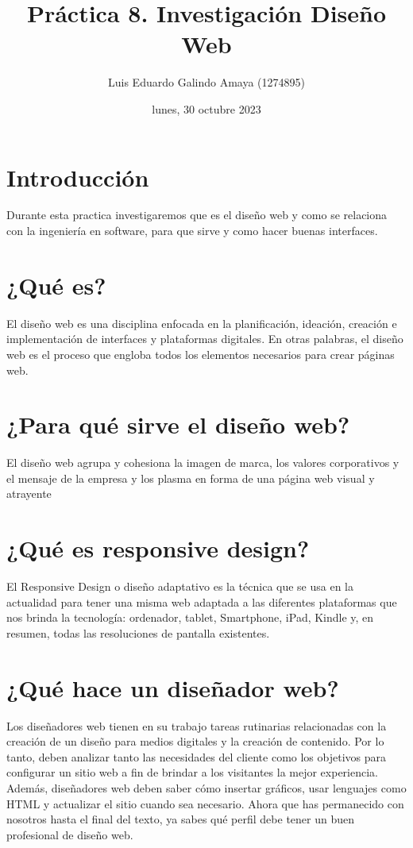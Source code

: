 \documentclass[11pt]{article}
\author{Luis Eduardo Galindo Amaya (1274895)}
\date{lunes, 30 octubre 2023}
\title{Práctica 8. Investigación Diseño Web}
\begin{document}
\makeatletter
\makeatletter
{}
\tableofcontents
\pagebreak
{}

\section{Introducción}
\label{sec:org85d6944}
Durante esta practica investigaremos que es el diseño web y como se relaciona
con la ingeniería en software, para que sirve y como hacer buenas interfaces.

\section{¿Qué es?}
\label{sec:org82e4fe4}
\autocite{sanchez_2022} El diseño web es una disciplina enfocada en la 
planificación, ideación, creación e implementación de interfaces y plataformas 
digitales. En otras palabras, el diseño web es el proceso que engloba todos los 
elementos necesarios para crear páginas web.

\section{¿Para qué sirve el diseño web?}
\label{sec:org528c002}
\autocite{sanchez_2022} El diseño web agrupa y cohesiona la imagen de
marca, los valores corporativos y el mensaje de la empresa y los plasma en 
forma de una página web visual y atrayente

\section{¿Qué es responsive design?}
\label{sec:org78dcf97}
\autocite{pallerols_2022} El Responsive Design o diseño adaptativo es la
técnica que se usa en la actualidad para tener una misma web adaptada a las 
diferentes plataformas que nos brinda la tecnología: ordenador, tablet, 
Smartphone, iPad, Kindle y, en resumen, todas las resoluciones de pantalla 
existentes.

\section{¿Qué hace un diseñador web?}
\label{sec:orgc6d7d28}
\autocite{Dias_Dourado_2021} Los diseñadores web tienen en su trabajo 
tareas rutinarias relacionadas con la creación de un diseño para medios 
digitales y la creación de contenido. Por lo tanto, deben analizar tanto las 
necesidades del cliente como los objetivos para configurar un sitio web a fin 
de brindar a los visitantes la mejor experiencia. Además, diseñadores web deben
saber cómo insertar gráficos, usar lenguajes como HTML y actualizar el sitio 
cuando sea necesario. Ahora que has permanecido con nosotros hasta el final del
texto, ya sabes qué perfil debe tener un buen profesional de diseño web. 
\end{document}
